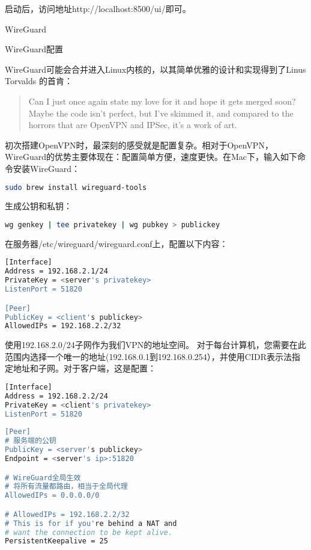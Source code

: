 \documentclass[8pt]{book}
\makeatletter
\numberwithin{dummy}{section}
\theoremstyle{ocrenumbox}
\theoremstyle{blacknumex}
\theoremstyle{blacknumbox}
\theoremstyle{ocrenum}
\renewcommand{\section}{\@startsection{section}{1}{\z@}
	{-4ex \@plus -1ex \@minus -.4ex}
	{1ex \@plus.2ex }
	{\normalfont\large\sffamily\bfseries}}
\renewcommand{\subsection}{\@startsection {subsection}{2}{\z@}
	{-3ex \@plus -0.1ex \@minus -.4ex}
	{0.5ex \@plus.2ex }
	{\normalfont\sffamily\bfseries}}
\makeatother
\begin{document}
启动后，访问地址http://localhost:8500/ui/即可。

\section{WireGuard}

\subsection{WireGuard配置}

WireGuard可能会合并进入Linux内核的，以其简单优雅的设计和实现得到了Linus Torvalds 的首肯：

\begin{quote}
Can I just once again state my love for it and hope it gets merged soon? Maybe the code isn’t perfect, but I’ve skimmed it, and compared to the horrors that are OpenVPN and IPSec, it’s a work of art.
\end{quote}


初次搭建OpenVPN时，最深刻的感受就是配置复杂。相对于OpenVPN，WireGuard的优势主要体现在：配置简单方便，速度更快。在Mac下，输入如下命令安装WireGuard：

\begin{lstlisting}[language=Bash]
sudo brew install wireguard-tools
\end{lstlisting}


生成公钥和私钥：

\begin{lstlisting}[language=Bash]
wg genkey | tee privatekey | wg pubkey > publickey
\end{lstlisting}

在服务器/etc/wireguard/wireguard.conf上，配置以下内容：

\begin{lstlisting}[language=Bash]
[Interface]　　
Address = 192.168.2.1/24　　
PrivateKey = <server's privatekey>　　
ListenPort = 51820　　

[Peer]　　
PublicKey = <client's publickey>　　
AllowedIPs = 192.168.2.2/32
\end{lstlisting}

使用192.168.2.0/24子网作为我们VPN的地址空间。 对于每台计算机，您需要在此范围内选择一个唯一的地址(192.168.0.1到192.168.0.254），并使用CIDR表示法指定地址和子网。对于客户端，这是配置：
\begin{lstlisting}[language=Bash]
[Interface]　　
Address = 192.168.2.2/24　　
PrivateKey = <client's privatekey>　　
ListenPort = 51820
　　
[Peer]
# 服务端的公钥　　
PublicKey = <server's publickey>　　
Endpoint = <server's ip>:51820　　

# WireGuard全局生效
# 将所有流量都路由，相当于全局代理
AllowedIPs = 0.0.0.0/0

# AllowedIPs = 192.168.2.2/32　　
# This is for if you're behind a NAT and　　
# want the connection to be kept alive.　　
PersistentKeepalive = 25
\end{lstlisting}
\end{document}
